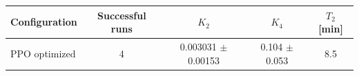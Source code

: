 \begin{tabular}{lcccc}
\toprule
Configuration & Successful runs & $K_2$ & $K_4$ & $T_2$ [min] \\
\midrule
PPO optimized & 4 & 0.003031 $\pm$ 0.00153 & 0.104 $\pm$ 0.053 & 8.5 \\
\bottomrule
\end{tabular}
